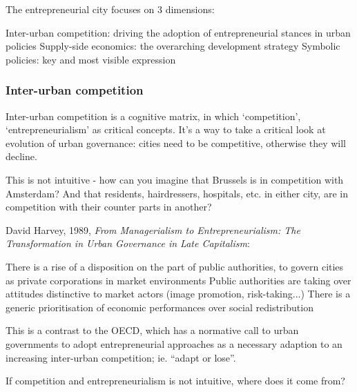 \documentclass{article}
\begin{document}
The entrepreneurial city focuses on 3 dimensions:
\begin{outline}
	\1 Inter-urban competition: driving the adoption of entrepreneurial stances in urban policies
	\1 Supply-side economics: the overarching development strategy
	\1 Symbolic policies: key and most visible expression 
\end{outline}

\subsubsection{Inter-urban competition}

Inter-urban competition is a cognitive matrix, in which `competition', `entrepreneurialism' as critical concepts. It's a way to take a critical look at evolution of urban governance: cities need to be competitive, otherwise they will decline.

This is not intuitive - how can you imagine that Brussels is in competition with Amsterdam? And that residents, hairdressers, hospitals, etc. in either city, are in competition with their counter parts in another?

David Harvey, 1989, \textit{From Managerialism to Entrepreneurialism: The Transformation in Urban Governance in Late Capitalism}:

\begin{outline}
	\1 There is a rise of a disposition on the part of public authorities, to govern cities as private corporations in market environments
	\1 Public authorities are taking over attitudes distinctive to market actors (image promotion, risk-taking...)
	\1 There is a generic prioritisation of economic performances over social redistribution
\end{outline}

This is a contrast to the OECD, which has a normative call to urban governments to adopt entrepreneurial approaches as a necessary adaption to an increasing inter-urban competition; ie. ``adapt or lose''.

If competition and entrepreneurialism is not intuitive, where does it come from? 
\end{document}
